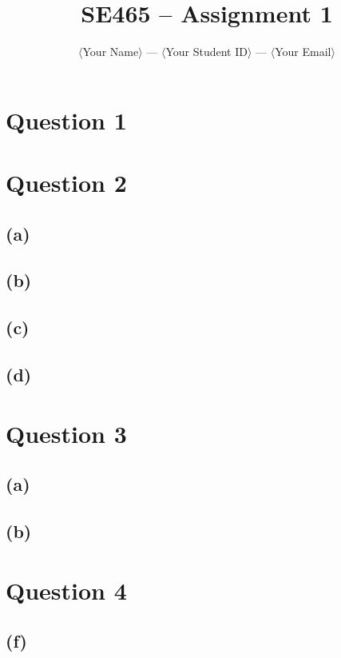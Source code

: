 \documentclass[12pt]{article}
\title{SE465 -- Assignment 1}
\author{$\langle$Your Name$\rangle$ --- $\langle$Your Student ID$\rangle$ --- $\langle$Your Email$\rangle$}
\begin{document}
\maketitle

\section*{Question 1}

\section*{Question 2}

\subsection*{(a)}

\subsection*{(b)}

\subsection*{(c)}

\subsection*{(d)}




\section*{Question 3}

\subsection*{(a)}

\subsection*{(b)}


\section*{Question 4}

\subsection*{(f)}
\end{document}
